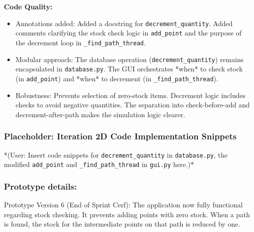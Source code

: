 \textbf{Code Quality:}
\begin{itemize}
	\item Annotations added: Added a docstring for \verb|decrement_quantity|. Added comments clarifying the stock check logic in \verb|add_point| and the purpose of the decrement loop in \verb|_find_path_thread|.
	\item Modular approach: The database operation (\verb|decrement_quantity|) remains encapsulated in \verb|database.py|. The GUI orchestrates *when* to check stock (in \verb|add_point|) and *when* to decrement (in \verb|_find_path_thread|).
	\item Robustness: Prevents selection of zero-stock items. Decrement logic includes checks to avoid negative quantities. The separation into check-before-add and decrement-after-path makes the simulation logic clearer.
\end{itemize}

\newpage
\subsubsection*{Placeholder: Iteration 2D Code Implementation Snippets}
*(User: Insert code snippets for \verb|decrement_quantity| in \verb|database.py|, the modified \verb|add_point| and \verb|_find_path_thread| in \verb|gui.py| here.)*
\newpage

\subsubsection{Prototype details:}
Prototype Version 6 (End of Sprint Cerf): The application now fully functional regarding stock checking. It prevents adding points with zero stock. When a path is found, the stock for the intermediate points on that path is reduced by one.

